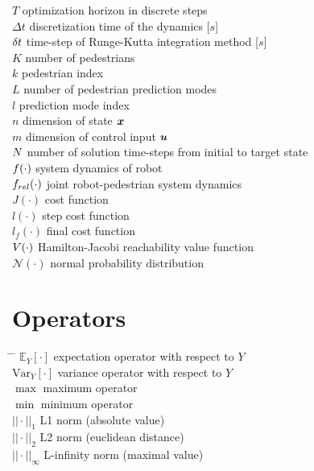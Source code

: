 \begin{tabbing}
$T$ \> optimization horizon in discrete steps \\[0.5ex]
$\Delta t$ \> discretization time of the dynamics [$s$] \\[0.5ex]
$\delta t$ \> time-step of Runge-Kutta integration method [$s$] \\[0.5ex]
$K$ \> number of pedestrians \\[0.5ex]
$k$ \> pedestrian index \\[0.5ex]
$L$ \> number of pedestrian prediction modes \\[0.5ex]
$l$ \> prediction mode index \\[0.5ex]
$n$ \> dimension of state $\boldsymbol{x}$ \\[0.5ex]
$m$ \> dimension of control input $\boldsymbol{u}$ \\[0.5ex]
$N$ \> number of solution time-steps from initial to target state \\[0.5ex]
$f(\cdot)$ \> system dynamics of robot \\[0.5ex]
$f_{rel}(\cdot)$ \> joint robot-pedestrian system dynamics \\[0.5ex]
$J(\cdot)$ \> cost function \\[0.5ex]
$l(\cdot)$ \> step cost function \\[0.5ex]
$l_f(\cdot)$ \> final cost function \\[0.5ex]
$V(\cdot)$ \> Hamilton-Jacobi reachability value function \\[0.5ex]
$\mathcal{N}(\cdot)$ \> normal probability distribution \\[0.5ex]
\end{tabbing}

\section*{Operators}
\begin{tabbing}
\hspace*{1.6cm} \= \hspace*{8cm} \= \kill
$\mathbb{E}_Y[\cdot]$ \> expectation operator with respect to $Y$ \\[0.5ex]
$\mathrm{Var}_Y[\cdot]$ \> variance operator with respect to $Y$ \\[0.5ex]
$\max$ \> maximum operator \\[0.5ex]
$\min$ \> minimum operator \\[0.5ex]
$||\cdot||_1$ \> L1 norm (absolute value) \\[0.5ex]
$||\cdot||_2$ \> L2 norm (euclidean distance) \\[0.5ex]
$||\cdot||_{\infty}$ \> L-infinity norm (maximal value) \\[0.5ex]
\end{tabbing}

